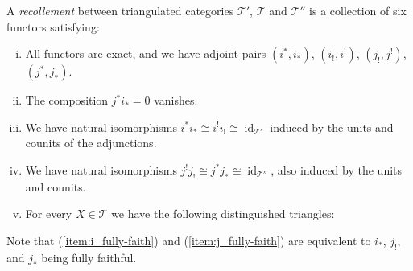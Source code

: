 \begin{defn}[Recollement]\label{def:recollement}
	A \emph{recollement} between triangulated categories $\mathcal T'$, $\mathcal T$ and $\mathcal T''$ is a collection of six functors satisfying:
\begin{center}
\end{center}

\begin{enumerate}[(i)]
	\item All functors are exact, and we have adjoint pairs $(i^*, i_*)$, $(i_!, i^!)$, $(j_!, j^!)$, $(j^*, j_*)$. 
	\item \label{recollement:vanishing_composition}The composition $j^*i_*=0$ vanishes.
	\item \label{item:i_fully-faith} 
	We have natural isomorphisms $i^*i_* \cong i^!i_! \cong \operatorname{id}_{\mathcal T'}$ induced by the units and counits of the adjunctions. 
	\item \label{item:j_fully-faith}
	We have natural isomorphisms $j^!j_! \cong j^*j_* \cong \operatorname{id}_{\mathcal T''}$, also induced by the units and counits. 
	\item \label{recollement:triangles}
	For every $X \in \mathcal T$ we have the following distinguished triangles:
	\begin{center}
	\end{center}
\end{enumerate}
Note that (\ref{item:i_fully-faith}) and (\ref{item:j_fully-faith}) are equivalent to $i_*$, $j_!$, and $j_*$ being fully faithful.
\end{defn}

